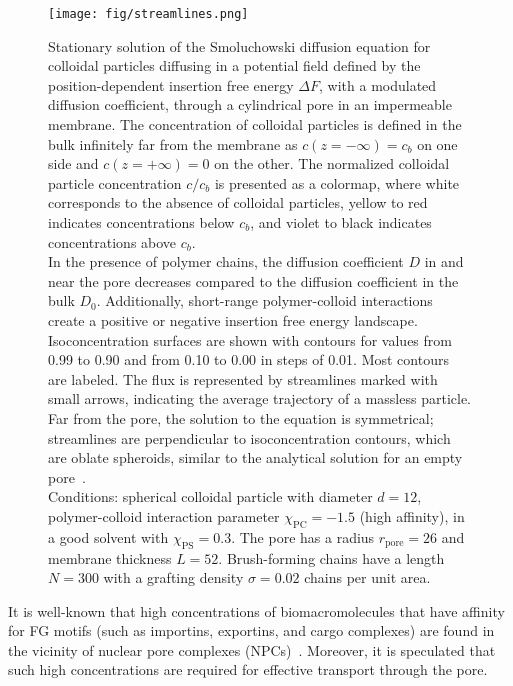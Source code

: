 \documentclass[12pt, a4paper]{article}
\newcommand\todo[1]{\textcolor{red}{#1}}
\begin{document}
\begin{figure}
    \centering
    \texttt{[image: fig/streamlines.png]}
    \caption{
    Stationary solution of the Smoluchowski diffusion equation for colloidal particles diffusing in a potential field defined by the position-dependent insertion free energy $\Delta F$, with a modulated diffusion coefficient, through a cylindrical pore in an impermeable membrane.
    The concentration of colloidal particles is defined in the bulk infinitely far from the membrane as $c(z = -\infty) = c_{b}$ on one side and $c(z = +\infty) = 0$ on the other.
    The normalized colloidal particle concentration $c / c_{b}$ is presented as a colormap, where white corresponds to the absence of colloidal particles, yellow to red indicates concentrations below $c_{b}$, and violet to black indicates concentrations above $c_{b}$.
    \\
    In the presence of polymer chains, the diffusion coefficient $D$ in and near the pore decreases compared to the diffusion coefficient in the bulk $D_0$.
    Additionally, short-range polymer-colloid interactions create a positive or negative insertion free energy landscape.
    \\
    Isoconcentration surfaces are shown with contours for values from 0.99 to 0.90 and from 0.10 to 0.00 in steps of 0.01.
    Most contours are labeled.
    The flux is represented by streamlines marked with small arrows, indicating the average trajectory of a massless particle.
    \\
    Far from the pore, the solution to the equation is symmetrical; streamlines are perpendicular to isoconcentration contours, which are oblate spheroids, similar to the analytical solution for an empty pore~\cite{Brunn1984}.
    \\
    Conditions: spherical colloidal particle with diameter $d = 12$, polymer-colloid interaction parameter $\chi_{\textrm{PC}} = -1.5$ (high affinity), in a good solvent with $\chi_{\textrm{PS}} = 0.3$.
    The pore has a radius $r_{\textrm{pore}} = 26$ and membrane thickness $L = 52$.
    Brush-forming chains have a length $N = 300$ with a grafting density $\sigma = 0.02$ chains per unit area.
    }
    \label{fig:colloid_concentration}
\end{figure}

It is well-known that high concentrations of biomacromolecules that have affinity for FG motifs (such as importins, exportins, and cargo complexes) are found in the vicinity of nuclear pore complexes (NPCs)~\cite{Beck2007, Gruenwald2010, Tu2011}.%
Moreover, it is speculated that such high concentrations are required for effective transport through the pore.%
\end{document}
